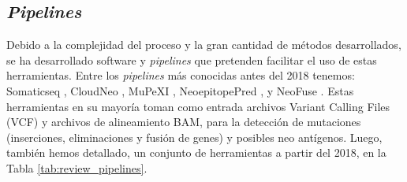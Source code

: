 \subsection{\textit{Pipelines}}

Debido a la complejidad del proceso y la gran cantidad de métodos desarrollados, se ha desarrollado software y \textit{pipelines} que pretenden facilitar el uso de estas herramientas. Entre los \textit{pipelines} más conocidas antes del 2018 tenemos: Somaticseq \citep{fang2015ensemble}, CloudNeo \citep{bais2017cloudneo}, MuPeXI \citep{bjerregaard2017mupexi}, NeoepitopePred \citep{tran2015immunogenicity}, y NeoFuse \citep{gros2016prospective}. Estas herramientas en su mayoría toman como entrada archivos Variant Calling Files (VCF) y archivos de alineamiento BAM, para la detección de mutaciones (inserciones, eliminaciones y fusión de genes) y posibles neo antígenos. Luego, también hemos detallado, un conjunto de herramientas a partir del 2018, en la Tabla \ref{tab:review_pipelines}.




